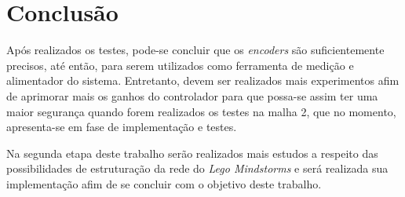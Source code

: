 %
%

\chapter{Conclusão}
\label{chap:conclusao}

Após realizados os testes, pode-se concluir  que os \emph{encoders} são suficientemente precisos, até então, para serem utilizados como ferramenta de medição e alimentador do sistema. Entretanto, devem ser realizados mais experimentos afim de aprimorar mais os ganhos do controlador para que possa-se assim ter uma maior segurança quando forem realizados os testes na malha 2, que no momento, apresenta-se em fase de implementação e testes. 

Na segunda etapa deste trabalho serão realizados mais estudos a respeito das possibilidades de estruturação da rede do \emph{Lego Mindstorms\textregistered} e será realizada sua implementação afim de se concluir com o objetivo deste trabalho.

